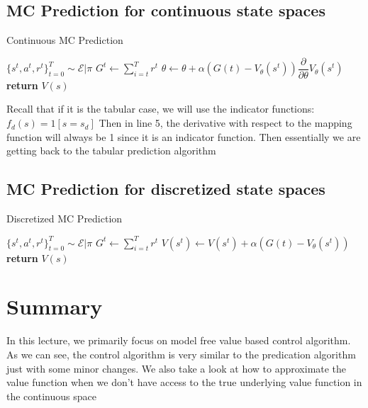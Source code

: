\documentclass[11pt]{article}
\begin{document}
\subsection{MC Prediction for continuous state spaces}
\begin{algorithm}[H]
\caption{Continuous MC Prediction}
\label{algo:CMC}
\begin{algorithmic}[1]
\STATE $\{s^t,a^t,r^t \}_{t=0}^T \sim \mathcal{E}|\pi$
\hfill
{}
\STATE $G^t \leftarrow \sum_{i=t}^T r^t$ \hfill
\STATE $\theta \leftarrow \theta + \alpha{(G(t) - V_\theta(s^t)) \dfrac{\partial}{\partial \theta}V_\theta(s^t)}$ 
\ENDFOR
\ENDFOR
\STATE \textbf{return} $V(s)$ \hfill
\end{algorithmic}
\end{algorithm}

Recall that if it is the tabular case, we will use the indicator functions: $f_d(s) = 1[s = s_d]$ Then in line 5, the derivative with respect to the mapping function will always be 1 since it is an indicator function. Then essentially we are getting back to the tabular prediction algorithm

\subsection{MC Prediction for discretized state spaces}
\begin{algorithm}[H]
\caption{Discretized MC Prediction}
\label{algo:DMC}
\begin{algorithmic}[1]
\STATE $\{s^t,a^t,r^t \}_{t=0}^T \sim \mathcal{E}|\pi$
\hfill
{}
\STATE $G^t \leftarrow \sum_{i=t}^T r^t$ \hfill
\STATE $V(s^t) \leftarrow V(s^t) + \alpha{(G(t) - V_\theta(s^t)) }$ 
\ENDFOR
\ENDFOR
\STATE \textbf{return} $V(s)$ \hfill
\end{algorithmic}
\end{algorithm}

\section{Summary}
In this lecture, we primarily focus on model free value based control algorithm. As we can see, the control algorithm is very similar to the predication algorithm just with some minor changes. We also take a look at how to approximate the value function when we don't have access to the true underlying value function in the continuous space
\end{document}

